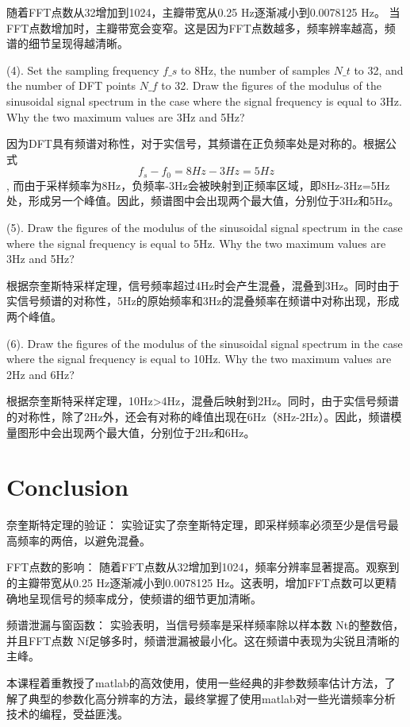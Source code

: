 \documentclass{article}
\begin{document}
随着FFT点数从32增加到1024，主瓣带宽从0.25 Hz逐渐减小到0.0078125 Hz。
当FFT点数增加时，主瓣带宽会变窄。这是因为FFT点数越多，频率辨率越高，频谱的细节呈现得越清晰。
\vspace{3em}

(4). Set the sampling frequency $f\_s$ to 8Hz, the number of samples $N\_t$ to 32, and the number of DFT points $N\_f$ to 32. Draw the figures of the modulus of the sinusoidal signal spectrum in the case where the signal frequency is equal to 3Hz. Why the two maximum values are 3Hz and 5Hz?

因为DFT具有频谱对称性，对于实信号，其频谱在正负频率处是对称的。根据公式
\begin{equation}
f_s - f_0 = 8Hz - 3Hz = 5Hz
\end{equation}
, 而由于采样频率为8Hz，负频率-3Hz会被映射到正频率区域，即8Hz-3Hz=5Hz处，形成另一个峰值。因此，频谱图中会出现两个最大值，分别位于3Hz和5Hz。
\vspace{3em}

(5). Draw the figures of the modulus of the sinusoidal signal spectrum in the case where the signal frequency is equal to 5Hz. Why the two maximum values are 3Hz and 5Hz?
\vspace{1em}

根据奈奎斯特采样定理，信号频率超过4Hz时会产生混叠，混叠到3Hz。同时由于实信号频谱的对称性，5Hz的原始频率和3Hz的混叠频率在频谱中对称出现，形成两个峰值。
\vspace{3em}

(6). Draw the figures of the modulus of the sinusoidal signal spectrum in the case where the signal frequency is equal to 10Hz. Why the two maximum values are 2Hz and 6Hz?\vspace{1em}

根据奈奎斯特采样定理，10Hz>4Hz，混叠后映射到2Hz。同时，由于实信号频谱的对称性，除了2Hz外，还会有对称的峰值出现在6Hz（8Hz-2Hz）。因此，频谱模量图形中会出现两个最大值，分别位于2Hz和6Hz。\vspace{3em}


\section{Conclusion}
奈奎斯特定理的验证：
实验证实了奈奎斯特定理，即采样频率必须至少是信号最高频率的两倍，以避免混叠。


FFT点数的影响：
随着FFT点数从32增加到1024，频率分辨率显著提高。观察到的主瓣带宽从0.25 Hz逐渐减小到0.0078125 Hz。这表明，增加FFT点数可以更精确地呈现信号的频率成分，使频谱的细节更加清晰。


频谱泄漏与窗函数：
实验表明，当信号频率是采样频率除以样本数 Nt的整数倍，并且FFT点数 Nf足够多时，频谱泄漏被最小化。这在频谱中表现为尖锐且清晰的主峰。

本课程着重教授了matlab的高效使用，使用一些经典的非参数频率估计方法，了解了典型的参数化高分辨率的方法，最终掌握了使用matlab对一些光谱频率分析技术的编程，受益匪浅。
\end{document}
